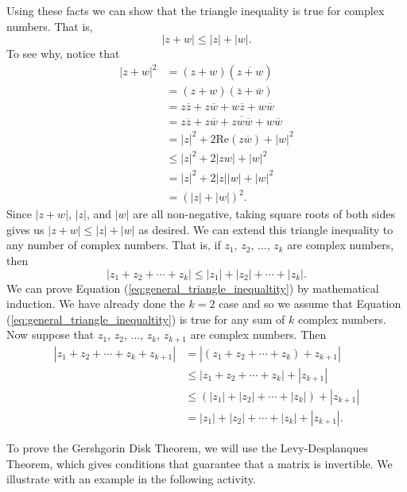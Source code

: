 Using these facts we can show that the triangle inequality is true for complex numbers. That is, 
\[|z+w| \leq |z| + |w|.\]
To see why, notice that 
\begin{align*}
|z+w|^2 &= (z+w)(\overline{z+w}) \\
	&= (z+w)(\overline{z} + \overline{w}) \\
	&= z\overline{z} + z\overline{w} + w \overline{z} + w \overline{w} \\
	&= z\overline{z} + z\overline{w} + \overline{zw\overline{w}} + w \overline{w} \\
	&= |z|^2 + 2\text{Re}(z\overline{w}) + |w|^2 \\
	&\leq |z|^2 + 2|zw| + |w|^2 \\
	&= |z|^2 + 2|z| |w| + |w|^2 \\
	&= (|z|+|w|)^2.
\end{align*}
Since $|z+w|$, $|z|$, and $|w|$ are all non-negative, taking square roots of both sides gives us $|z+w| \leq |z| + |w|$ as desired. We can extend this triangle inequality to any number of complex numbers. That is, if $z_1$, $z_2$, $\ldots$, $z_k$ are complex numbers, then 
\begin{equation} \label{eq:general_triangle_inequaltity}
|z_1+z_2+ \cdots + z_k| \leq |z_1| + |z_2| + \cdots + |z_k|.
\end{equation}
We can prove Equation (\ref{eq:general_triangle_inequaltity}) by mathematical induction. We have already done the $k=2$ case and so we assume that Equation (\ref{eq:general_triangle_inequaltity}) is true for any sum of $k$ complex numbers. Now suppose that $z_1$, $z_2$, $\ldots$, $z_k$, $z_{k+1}$ are complex numbers. Then 
\begin{align*}
|z_1+z_2+ \cdots + z_k + z_{k+1}| &= |(z_1+z_2+ \cdots + z_k) + z_{k+1}| \\
	&\leq |z_1+z_2+ \cdots + z_k| + |z_{k+1}| \\
	&\leq (|z_1| + |z_2| + \cdots + |z_k|) + |z_{k+1}| \\
	&= |z_1| + |z_2| + \cdots + |z_k| + |z_{k+1}|.
\end{align*}

To prove the Gershgorin Disk Theorem, we will use the Levy-Desplanques Theorem, which gives conditions that guarantee that a matrix is invertible. We illustrate with an example in the following activity.

